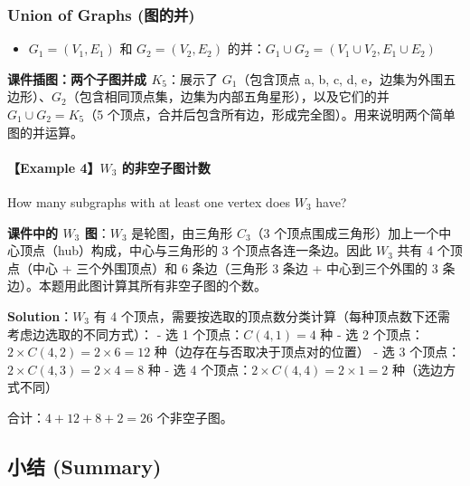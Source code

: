 \documentclass[10pt,a4paper,openany]{ctexbook}
\theoremstyle{definition}
\theoremstyle{remark}
\renewenvironment{quote}
  {\list{}{\leftmargin=1em\rightmargin=0pt\topsep=0.5pt\partopsep=0pt}\item[]}
  {\endlist}
\begin{document}
\subsubsection{Union of Graphs (图的并)}

\begin{itemize}
\item $G_1 = (V_1, E_1)$ 和 $G_2 = (V_2, E_2)$ 的并：$G_1 \cup G_2 = (V_1 \cup V_2, E_1 \cup E_2)$

\end{itemize}

\textbf{课件插图：两个子图并成 $K_5$}：展示了 $G_1$（包含顶点 a, b, c, d, e，边集为外围五边形）、$G_2$（包含相同顶点集，边集为内部五角星形），以及它们的并 $G_1 \cup G_2 = K_5$（5 个顶点，合并后包含所有边，形成完全图）。用来说明两个简单图的并运算。
\paragraph{【Example 4】$W_3$ 的非空子图计数}

\begin{quote}
How many subgraphs with at least one vertex does $W_3$ have?

\textbf{课件中的 $W_3$ 图}：$W_3$ 是轮图，由三角形 $C_3$（3 个顶点围成三角形）加上一个中心顶点（hub）构成，中心与三角形的 3 个顶点各连一条边。因此 $W_3$ 共有 4 个顶点（中心 + 三个外围顶点）和 6 条边（三角形 3 条边 + 中心到三个外围的 3 条边）。本题用此图计算其所有非空子图的个数。

\textbf{Solution}：$W_3$ 有 4 个顶点，需要按选取的顶点数分类计算（每种顶点数下还需考虑边选取的不同方式）：
- 选 1 个顶点：$C(4,1) = 4$ 种
- 选 2 个顶点：$2 \times C(4,2) = 2 \times 6 = 12$ 种（边存在与否取决于顶点对的位置）
- 选 3 个顶点：$2 \times C(4,3) = 2 \times 4 = 8$ 种
- 选 4 个顶点：$2 \times C(4,4) = 2 \times 1 = 2$ 种（选边方式不同）

合计：$4 + 12 + 8 + 2 = 26$ 个非空子图。

\end{quote}
\vspace{-2pt}

\subsection{小结 (Summary)}
\end{document}
